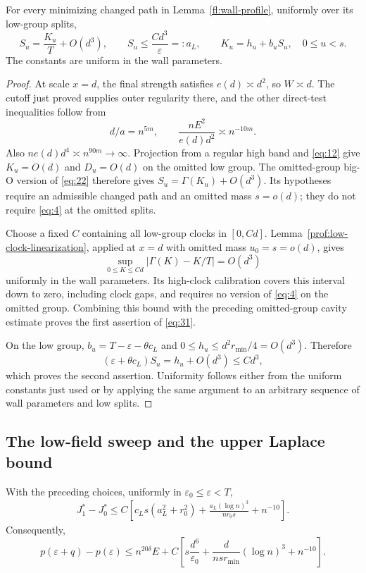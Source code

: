 \begin{lemma}\label{fl:low-mean}
For every minimizing changed path in Lemma~\ref{fl:wall-profile},
uniformly over its low-group splits,
\begin{equation}
 S_u=\frac{K_u}{T}+O(d^3),\qquad
 S_u\le\frac{C d^3}{\varepsilon}=:a_L,
 \qquad K_u=h_u+b_uS_u,\quad 0\le u<s.
 \tag{31}\label{eq:31}
\end{equation}
The constants are uniform in the wall parameters.
\end{lemma}

\begin{proof}
At scale $x=d$, the final strength satisfies $e(d)\asymp d^2$, so
$W\asymp d$. The cutoff just proved supplies outer regularity there,
and the other direct-test inequalities follow from
\[
 d/a=n^{5m},\qquad
 \frac{nE^2}{e(d)d^2}\asymp n^{-10m}.
\]
Also $ne(d)d^4\asymp n^{90m}\to\infty$.
Projection from a regular high
band and \eqref{eq:12} give $K_u=O(d)$ and $D_u=O(d)$ on the omitted
low group.  The omitted-group big-O version of \eqref{eq:22} therefore
gives $S_u=\Gamma(K_u)+O(d^3)$.  Its hypotheses require an admissible
changed path and an omitted mass $s=o(d)$; they do not require
\eqref{eq:4} at the omitted splits.

Choose a fixed $C$ containing all low-group clocks in $[0,Cd]$.
Lemma~\ref{prof:low-clock-linearization}, applied at $x=d$ with
omitted mass $u_0=s=o(d)$, gives
\[
 \sup_{0\le K\le Cd}|\Gamma(K)-K/T|=O(d^3)
\]
uniformly in the wall parameters. Its high-clock calibration
covers this interval down to zero, including clock gaps, and
requires no version of \eqref{eq:4} on the omitted group.
Combining this bound with the preceding omitted-group cavity
estimate proves the first assertion of \eqref{eq:31}.

On the low group,
$b_u=T-\varepsilon-\theta c_L$ and
$0\le h_u\le d^2r_{\min}/4=O(d^3)$.  Therefore
\[
 (\varepsilon+\theta c_L)S_u=h_u+O(d^3)\le C d^3,
\]
which proves the second assertion.  Uniformity follows either from
the uniform constants just used or by applying the same argument to
an arbitrary sequence of wall parameters and low splits.
\end{proof}

\subsection{The low-field sweep and the upper Laplace bound}

\begin{lemma}\label{fl:wall-cost}
With the preceding choices, uniformly in
$\varepsilon_0\le\varepsilon<T$,
\[
\begin{split}
 J_1^*-J_0^*
 \le C\left[
    c_Ls(a_L^2+r_0^2)
       +\frac{a_L(\log n)^3}{nr_0s}+n^{-10}\right].
\end{split}
\]
Consequently,
\[
 p(\varepsilon+q)-p(\varepsilon)
 \le n^{20\delta}E
       +C\left[s\frac{d^6}{\varepsilon_0}
              +\frac{d}{nsr_{\min}}(\log n)^3+n^{-10}\right].
\]
\end{lemma}

